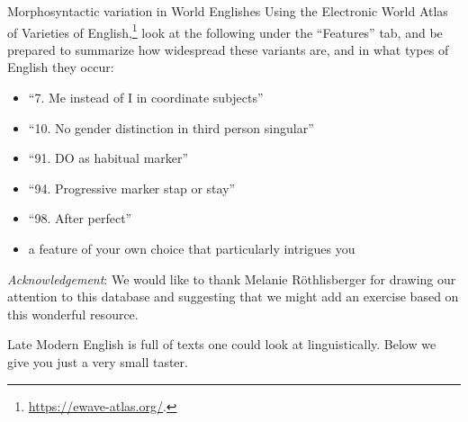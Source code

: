\begin{exercises}{Morphosyntactic variation in World Englishes}
\largerpage
Using the Electronic World Atlas of Varieties of English,\footnote{\url{https://ewave-atlas.org/}.} look at the following under the ``Features'' tab, and be prepared to summarize how widespread these variants are, and in what types of English they occur:
\begin{itemize}
    \item ``7. Me instead of I in coordinate subjects''
    \item ``10. No gender distinction in third person singular''
    \item ``91. DO as habitual marker''
    \item ``94. Progressive marker stap or stay''
    \item ``98. After perfect''
    \item a feature of your own choice that particularly intrigues you
\end{itemize}

\noindent \emph{Acknowledgement}: We would like to thank Melanie Röthlisberger for drawing our attention to this database and suggesting that we might add an exercise based on this wonderful resource.
\end{exercises}


\largerpage
Late Modern English is full of texts one could look at linguistically. Below we give you just a very small taster.

